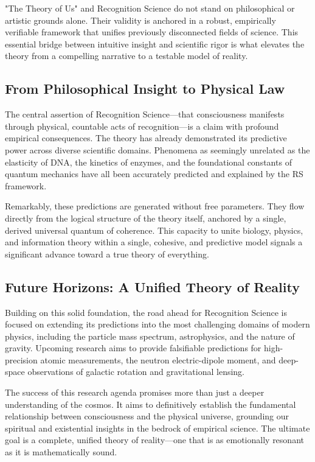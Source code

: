 \documentclass[12pt]{article}
\begin{document}
"The Theory of Us" and Recognition Science do not stand on philosophical or artistic grounds alone. Their validity is anchored in a robust, empirically verifiable framework that unifies previously disconnected fields of science. This essential bridge between intuitive insight and scientific rigor is what elevates the theory from a compelling narrative to a testable model of reality.

\subsection{From Philosophical Insight to Physical Law}

The central assertion of Recognition Science—that consciousness manifests through physical, countable acts of recognition—is a claim with profound empirical consequences. The theory has already demonstrated its predictive power across diverse scientific domains. Phenomena as seemingly unrelated as the elasticity of DNA, the kinetics of enzymes, and the foundational constants of quantum mechanics have all been accurately predicted and explained by the RS framework.

Remarkably, these predictions are generated without free parameters. They flow directly from the logical structure of the theory itself, anchored by a single, derived universal quantum of coherence. This capacity to unite biology, physics, and information theory within a single, cohesive, and predictive model signals a significant advance toward a true theory of everything.

\subsection{Future Horizons: A Unified Theory of Reality}

Building on this solid foundation, the road ahead for Recognition Science is focused on extending its predictions into the most challenging domains of modern physics, including the particle mass spectrum, astrophysics, and the nature of gravity. Upcoming research aims to provide falsifiable predictions for high-precision atomic measurements, the neutron electric-dipole moment, and deep-space observations of galactic rotation and gravitational lensing.

The success of this research agenda promises more than just a deeper understanding of the cosmos. It aims to definitively establish the fundamental relationship between consciousness and the physical universe, grounding our spiritual and existential insights in the bedrock of empirical science. The ultimate goal is a complete, unified theory of reality—one that is as emotionally resonant as it is mathematically sound.
\end{document}
